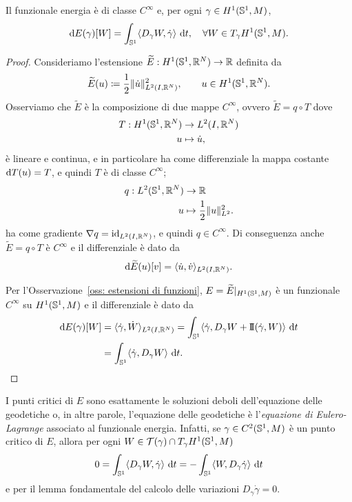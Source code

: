 \begin{teo}\label{teo: energia è liscia}
	Il funzionale energia è di classe \(C^\infty\) e, per ogni \(\gamma \in H^1(\mathbb{S}^1,M)\),
	\[
	\mathrm{d} E(\gamma) [W] = \int_{\mathbb{S}^1} \langle D_\gamma W, \dot \gamma \rangle \ \mathrm{d} t, \quad \forall W \in T_\gamma H^1(\mathbb{S}^1,M).
	\]
\end{teo}
\begin{proof}
	Consideriamo l'estensione \(\widetilde{E}:H^1(\mathbb{S}^1,\mathbb{R}^N) \to \mathbb{R}\) definita da
	\[
	\widetilde{E}(u) \coloneq \frac{1}{2}\|\dot u \|^2_{L^2(I,\mathbb{R}^N)}, \qquad u \in H^1(\mathbb{S}^1,\mathbb{R}^N).
	\]
	Osserviamo che \(\widetilde{E}\) è la composizione di due mappe \(C^\infty\), ovvero \(\widetilde{E}=q \circ T\) dove
	\begin{align*}
		T: H^1(\mathbb{S}^1,\mathbb{R}^N) &\to L^2(I,\mathbb{R}^N) \\
		u &\mapsto \dot u,
	\end{align*}
	è lineare e continua, e in particolare ha come differenziale la mappa costante \(\mathrm{d} T(u)=T\), e quindi \(T\) è di classe \(C^\infty\);
	\begin{align*}
		q: L^2(\mathbb{S}^1,\mathbb{R}^N) &\to \mathbb{R} \\
		u &\mapsto \frac{1}{2} \| u \|^2_{L^2}.
	\end{align*}
	ha come gradiente \(\nabla q = \mathrm{id}_{L^2(I,\mathbb{R}^N)}\), e quindi \(q \in C^\infty\). Di conseguenza anche \(\widetilde{E}=q \circ T\) è \(C^\infty\) e il differenziale è dato da
	\[
		\mathrm{d} \widetilde{E}(u)[v] = \langle \dot u, \dot v \rangle_{L^2(I,\mathbb{R}^N)}.
	\]
	
	Per l'Osservazione~\ref{oss: estensioni di funzioni}, \(E= \widetilde{E}|_{H^1(\mathbb{S}^1,M)}\) è un funzionale \(C^\infty\) su \(H^1(\mathbb{S}^1,M)\) e il differenziale è dato da
	\begin{align*}
		\dif E(\gamma)[W] &= \langle \dot \gamma, \dot W  \rangle_{L^2(I,\R^N)} = \int_{\Sp^1} \langle \dot \gamma, D_\gamma W + \sff(\dot \gamma,W)\rangle \ \dif t \\
		&= \int_{\Sp^1} \langle \dot \gamma, D_\gamma W\rangle  \ \dif t.
	\end{align*}
	
\end{proof}

\begin{oss}\label{oss: soluzioni deboli dell'equazione delle geodetiche}
	I punti critici di \(E\) sono esattamente le soluzioni deboli dell'equazione delle geodetiche o, in altre parole, l'equazione delle geodetiche è l'\textit{equazione di Eulero-Lagrange} associato al funzionale energia. Infatti, se \(\gamma \in C^2(\mathbb{S}^1,M) \) è un punto critico di \(E\), allora per ogni \(W \in \mathcal{T}(\gamma) \cap T_\gamma H^1(\mathbb{S}^1,M)\)
	\[
	 0=\int_{\mathbb{S}^1} \langle D_\gamma W, \dot \gamma \rangle \ \mathrm{d} t = - \int_{\mathbb{S}^1} \langle W, D_\gamma \dot \gamma \rangle \ \mathrm{d} t
	\]
	e per il lemma fondamentale del calcolo delle variazioni \(D_\gamma \dot \gamma = 0\).
	
\end{oss}


